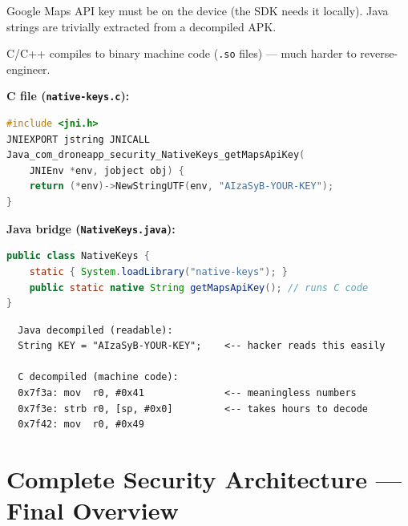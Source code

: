 \documentclass[11pt,a4paper]{article}
\begin{document}
\begin{problembox}
Google Maps API key must be on the device (the SDK needs it locally). Java strings are trivially extracted from a decompiled APK.
\end{problembox}

\begin{solutionbox}
C/C++ compiles to binary machine code (\texttt{.so} files) --- much harder to reverse-engineer.

\textbf{C file (\texttt{native-keys.c}):}
\begin{lstlisting}[language=C]
#include <jni.h>
JNIEXPORT jstring JNICALL
Java_com_droneapp_security_NativeKeys_getMapsApiKey(
    JNIEnv *env, jobject obj) {
    return (*env)->NewStringUTF(env, "AIzaSyB-YOUR-KEY");
}
\end{lstlisting}

\textbf{Java bridge (\texttt{NativeKeys.java}):}
\begin{lstlisting}[language=Java]
public class NativeKeys {
    static { System.loadLibrary("native-keys"); }
    public static native String getMapsApiKey(); // runs C code
}
\end{lstlisting}
\end{solutionbox}

\begin{diagrambox}
\begin{verbatim}
  Java decompiled (readable):
  String KEY = "AIzaSyB-YOUR-KEY";    <-- hacker reads this easily

  C decompiled (machine code):
  0x7f3a: mov  r0, #0x41              <-- meaningless numbers
  0x7f3e: strb r0, [sp, #0x0]         <-- takes hours to decode
  0x7f42: mov  r0, #0x49
\end{verbatim}
\end{diagrambox}

\newpage
\section{Complete Security Architecture --- Final Overview}
\end{document}
